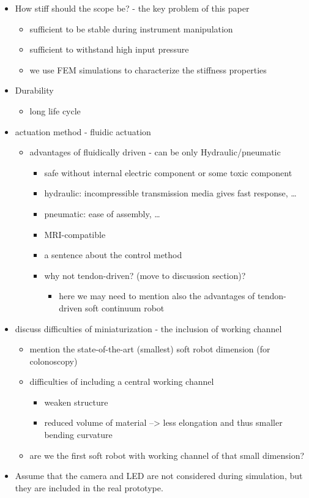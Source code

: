 \documentclass[journal,onecolumn]{IEEEtran}
\begin{document}
\begin{itemize}
\item How stiff should the scope be? - the key problem of this paper
\begin{itemize}
\item sufficient to be stable during instrument manipulation
\item sufficient to withstand high input pressure
\item we use FEM simulations to characterize the stiffness properties
\end{itemize}

\item Durability
\begin{itemize}
\item long life cycle
\end{itemize}

\item actuation method - fluidic actuation 
\begin{itemize}
\item advantages of fluidically driven - can be only Hydraulic/pneumatic
\begin{itemize}
\item safe without internal electric component or some toxic component
\item hydraulic: incompressible transmission media gives fast response, \ldots{}
\item pneumatic: ease of assembly, \ldots{}
\item MRI-compatible
\item a sentence about the control method
\item why not tendon-driven? (move to discussion section)?
\begin{itemize}
\item here we may need to mention also the advantages of tendon-driven soft continuum robot
\end{itemize}
\end{itemize}
\end{itemize}

\item discuss difficulties of miniaturization - the inclusion of working channel
\begin{itemize}
\item mention the state-of-the-art (smallest) soft robot dimension (for colonoscopy)
\item difficulties of including a central working channel
\begin{itemize}
\item weaken structure
\item reduced volume of material --> less elongation and thus smaller bending curvature
\end{itemize}
\item are we the first soft robot with working channel of that small dimension?
\end{itemize}

\item Assume that the camera and LED are not considered during simulation, but they are included in the real prototype.
\end{itemize}
\end{document}
